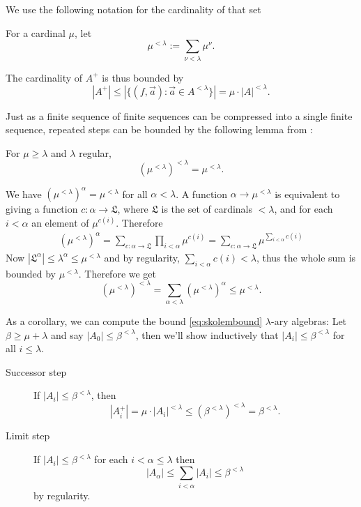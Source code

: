 We use the following notation for the cardinality of that set
\begin{Definition}
For a cardinal $\mu$, let
\[ \mu^{< \lambda} := \sum_{\nu < \lambda} \mu^\nu. \]
\end{Definition}

The cardinality of $A^+$ is thus bounded by
\[ |A^+| \leq |\{ (f,\vec a) : \vec a \in A^{< \lambda} \}| = \mu \cdot |A|^{< \lambda}. \]

Just as a finite sequence of finite sequences can be compressed into a single finite sequence, repeated steps can be bounded by the following lemma from \cite[\nopp~2.10]{AdamekRosicky}:

\begin{Lemma}
For $\mu \geq \lambda$ and $\lambda$ regular, 
\[ \left(\mu^{< \lambda}\right)^{< \lambda} = \mu^{< \lambda}. \]
\end{Lemma}
\begin{Proof}
We have $(\mu^{< \lambda})^\alpha = \mu^{< \lambda}$ for all $\alpha < \lambda$. A function $\alpha \to \mu^{< \lambda}$ is equivalent to giving a function $c : \alpha \to \mathfrak L$, where $\mathfrak L$ is the set of cardinals $< \lambda$, and for each $i< \alpha$ an element of $\mu^{c(i)}$. Therefore 
\begin{align*}
(\mu^{< \lambda})^\alpha = \sum_{c : \alpha \to \mathfrak L} \prod_{i < \alpha} \mu^{c(i)} 
= \sum_{c : \alpha \to \mathfrak L} \mu^{\sum_{i < \alpha} c(i)}
\end{align*}
Now $|\mathfrak L^\alpha| \leq \lambda^\alpha \leq \mu^{< \lambda}$ and by regularity, $\sum_{i < \alpha} c(i) < \lambda$, thus the whole sum is bounded by $\mu^{< \lambda}$. Therefore we get
\[ (\mu^{< \lambda})^{< \lambda} = \sum_{\alpha < \lambda} (\mu^{< \lambda})^\alpha \leq \mu^{< \lambda}. \]
\end{Proof}

As a corollary, we can compute the bound \eqref{eq:skolembound} $\lambda$-ary algebras: Let $\beta \geq \mu + \lambda$ and say $|A_0| \leq \beta^{< \lambda}$, then we'll show inductively that $|A_i| \leq \beta^{< \lambda}$ for all $i \leq \lambda$.
\begin{description}
\item[Successor step] If $|A_i| \leq \beta^{< \lambda}$, then
\[ |A_i^+| = \mu \cdot |A_i|^{< \lambda} \leq \left(\beta^{< \lambda}\right)^{< \lambda} = \beta^{< \lambda}. \]
\item[Limit step] If $|A_i| \leq \beta^{< \lambda}$ for each $i < \alpha \leq \lambda$ then
\[ |A_\alpha| \leq \sum_{i < \alpha} |A_i| \leq \beta^{< \lambda} \]
by regularity.
\end{description}

